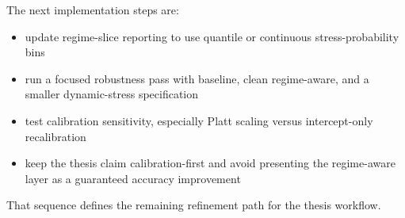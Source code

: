 The next implementation steps are:

\begin{itemize}
    \item update regime-slice reporting to use quantile or continuous stress-probability bins
    \item run a focused robustness pass with baseline, clean regime-aware, and a smaller dynamic-stress specification
    \item test calibration sensitivity, especially Platt scaling versus intercept-only recalibration
    \item keep the thesis claim calibration-first and avoid presenting the regime-aware layer as a guaranteed accuracy improvement
\end{itemize}

That sequence defines the remaining refinement path for the thesis workflow.
